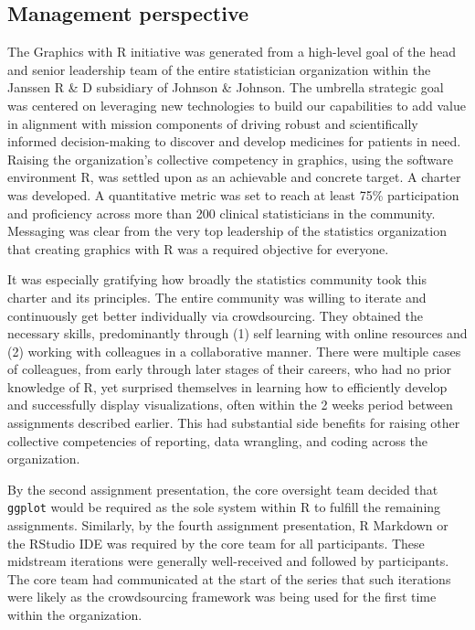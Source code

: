 \hypertarget{management-perspective}{%
\subsection{Management perspective}\label{management-perspective}}

The Graphics with R initiative was generated from a high-level goal of
the head and senior leadership team of the entire statistician
organization within the Janssen R \& D subsidiary of Johnson \& Johnson.
The umbrella strategic goal was centered on leveraging new technologies
to build our capabilities to add value in alignment with mission
components of driving robust and scientifically informed decision-making
to discover and develop medicines for patients in need. Raising the
organization's collective competency in graphics, using the software
environment R, was settled upon as an achievable and concrete target. A
charter was developed. A quantitative metric was set to reach at least
75\% participation and proficiency across more than 200 clinical
statisticians in the community. Messaging was clear from the very top
leadership of the statistics organization that creating graphics with R
was a required objective for everyone.

It was especially gratifying how broadly the statistics community took
this charter and its principles. The entire community was willing to
iterate and continuously get better individually via crowdsourcing. They
obtained the necessary skills, predominantly through (1) self learning
with online resources and (2) working with colleagues in a collaborative
manner. There were multiple cases of colleagues, from early through
later stages of their careers, who had no prior knowledge of R, yet
surprised themselves in learning how to efficiently develop and
successfully display visualizations, often within the 2 weeks period
between assignments described earlier. This had substantial side
benefits for raising other collective competencies of reporting, data
wrangling, and coding across the organization.

By the second assignment presentation, the core oversight team decided
that \texttt{ggplot} would be required as the sole system within R to
fulfill the remaining assignments. Similarly, by the fourth assignment
presentation, R Markdown or the RStudio IDE was required by the core
team for all participants. These midstream iterations were generally
well-received and followed by participants. The core team had
communicated at the start of the series that such iterations were likely
as the crowdsourcing framework was being used for the first time within
the organization.

